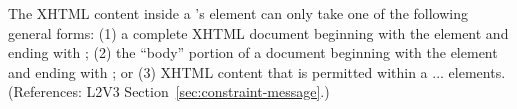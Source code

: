 The XHTML content inside a \Constraint's  element can only
take one of the following general forms: (1) a complete XHTML document
beginning with the element  and ending with ;
(2) the ``body'' portion of a document beginning with the element
 and ending with ; or (3) XHTML content that
is permitted within a  ...  elements.
(References: L2V3 Section~\ref{sec:constraint-message}.)
